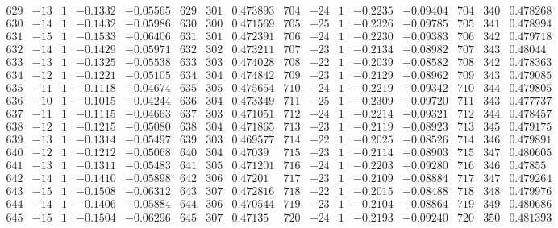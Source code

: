 \documentclass[11pt,reqno,a4letter]{article}
\numberwithin{figure}{section}
\numberwithin{table}{section}
\theoremstyle{plain}
\numberwithin{theorem}{section}
\theoremstyle{definition}
\begin{document}
\begin{table}[ht]
\begin{equation*}
{\begin{array}{ccccc|ccc|ccccc|ccc}
 629 & -13 & 1 & -0.1332 & -0.05565 & 629 & 301 & 0.473893 & 704 & -24 & 1 & -0.2235 & -0.09404 & 704 & 340 & 0.478268 \\
 630 & -14 & 1 & -0.1432 & -0.05986 & 630 & 300 & 0.471569 & 705 & -25 & 1 & -0.2326 & -0.09785 & 705 & 341 & 0.478994 \\
 631 & -15 & 1 & -0.1533 & -0.06406 & 631 & 301 & 0.472391 & 706 & -24 & 1 & -0.2230 & -0.09383 & 706 & 342 & 0.479718 \\
 632 & -14 & 1 & -0.1429 & -0.05971 & 632 & 302 & 0.473211 & 707 & -23 & 1 & -0.2134 & -0.08982 & 707 & 343 & 0.48044 \\
 633 & -13 & 1 & -0.1325 & -0.05538 & 633 & 303 & 0.474028 & 708 & -22 & 1 & -0.2039 & -0.08582 & 708 & 342 & 0.478363 \\
 634 & -12 & 1 & -0.1221 & -0.05105 & 634 & 304 & 0.474842 & 709 & -23 & 1 & -0.2129 & -0.08962 & 709 & 343 & 0.479085 \\
 635 & -11 & 1 & -0.1118 & -0.04674 & 635 & 305 & 0.475654 & 710 & -24 & 1 & -0.2219 & -0.09342 & 710 & 344 & 0.479805 \\
 636 & -10 & 1 & -0.1015 & -0.04244 & 636 & 304 & 0.473349 & 711 & -25 & 1 & -0.2309 & -0.09720 & 711 & 343 & 0.477737 \\
 637 & -11 & 1 & -0.1115 & -0.04663 & 637 & 303 & 0.471051 & 712 & -24 & 1 & -0.2214 & -0.09321 & 712 & 344 & 0.478457 \\
 638 & -12 & 1 & -0.1215 & -0.05080 & 638 & 304 & 0.471865 & 713 & -23 & 1 & -0.2119 & -0.08923 & 713 & 345 & 0.479175 \\
 639 & -13 & 1 & -0.1314 & -0.05497 & 639 & 303 & 0.469577 & 714 & -22 & 1 & -0.2025 & -0.08526 & 714 & 346 & 0.479891 \\
 640 & -12 & 1 & -0.1212 & -0.05068 & 640 & 304 & 0.47039 & 715 & -23 & 1 & -0.2114 & -0.08903 & 715 & 347 & 0.480605 \\
 641 & -13 & 1 & -0.1311 & -0.05483 & 641 & 305 & 0.471201 & 716 & -24 & 1 & -0.2203 & -0.09280 & 716 & 346 & 0.47855 \\
 642 & -14 & 1 & -0.1410 & -0.05898 & 642 & 306 & 0.47201 & 717 & -23 & 1 & -0.2109 & -0.08884 & 717 & 347 & 0.479264 \\
 643 & -15 & 1 & -0.1508 & -0.06312 & 643 & 307 & 0.472816 & 718 & -22 & 1 & -0.2015 & -0.08488 & 718 & 348 & 0.479976 \\
 644 & -14 & 1 & -0.1406 & -0.05884 & 644 & 306 & 0.470544 & 719 & -23 & 1 & -0.2104 & -0.08864 & 719 & 349 & 0.480686 \\
 645 & -15 & 1 & -0.1504 & -0.06296 & 645 & 307 & 0.47135 & 720 & -24 & 1 & -0.2193 & -0.09240 & 720 & 350 & 0.481393 \\

\end{array}}
\end{equation*}
\end{table}
\end{document}
